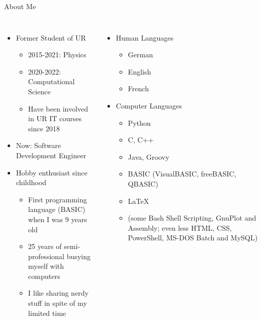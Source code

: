 
\begin{frame}[t,plain]
\titlepage
\end{frame}


\begin{frame}{About Me}
%
\begin{columns}[T]
\begin{itemize}
\item Former Student of UR
	\begin{itemize}
	\item 2015-2021: Physics
	\item 2020-2022: Computational Science
	\item Have been involved in UR IT courses since 2018
	\end{itemize}
\item Now: Software Development Engineer
\item Hobby enthusiast since childhood
	\begin{itemize}
	\item First programming language (BASIC) when I was 9 years old
	\item 25 years of semi-professional busying myself with computers
	\item I like sharing nerdy stuff in spite of my limited time
	\end{itemize}
\end{itemize}
%
\begin{itemize}
\item Human Languages
	\begin{itemize}
	\item German
	\item English
	\item French
	\end{itemize}
\item Computer Languages
	\begin{itemize}
	\item Python
	\item C, C++
	\item Java, Groovy
	\item BASIC (VisualBASIC, freeBASIC, QBASIC)
	\item \LaTeX
	\item (some Bash Shell Scripting, GnuPlot and Assembly; even less HTML, CSS, PowerShell, MS-DOS Batch and MySQL)
	\end{itemize}
\end{itemize}
\end{columns}
%
\end{frame}

